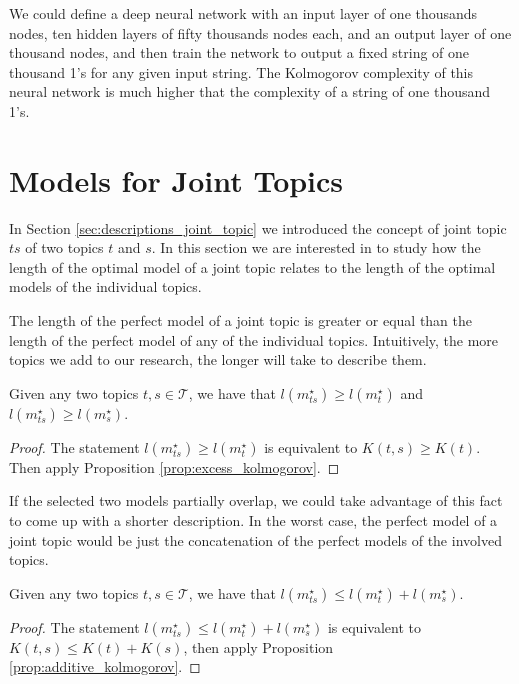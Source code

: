 \begin{example}
\label{ex:description_neural}
We could define a deep neural network with an input layer of one thousands nodes, ten hidden layers of fifty thousands nodes each, and an output layer of one thousand nodes, and then train the network to output a fixed string of one thousand 1's for any given input string. The Kolmogorov complexity of this neural network is much higher that the complexity of a string of one thousand 1's.
\end{example}

%
%

\section{Models for Joint Topics}
\label{sec:descriptions_joint_model}

In Section \ref{sec:descriptions_joint_topic} we introduced the concept of joint topic $ts$ of two topics $t$ and $s$. In this section we are interested in to study how the length of the optimal model of a joint topic relates to the length of the optimal models of the individual topics.

The length of the perfect model of a joint topic is greater or equal than the length of the perfect model of any of the individual topics. Intuitively, the more topics we add to our research, the longer will take to describe them.

\begin{proposition}
\label{prop:joint_length}
Given any two topics $t,s \in \mathcal{T}$, we have that $l \left( m_{ts}^{\star} \right) \geq l \left( m_{t}^{\star} \right)$ and $l \left( m_{ts}^{\star} \right) \geq l \left( m_{s}^{\star} \right)$.
\end{proposition}
\begin{proof}
The statement $l \left( m_{ts}^{\star} \right) \geq l \left( m_{t}^{\star} \right)$ is equivalent to $K(t,s) \geq K(t)$. Then apply Proposition \ref{prop:excess_kolmogorov}.
\end{proof}

If the selected two models partially overlap, we could take advantage of this fact to come up with a shorter description. In the worst case, the perfect model of a joint topic would be just the concatenation of the perfect models of the involved topics.

\begin{proposition}
\label{prop:joint_sum}
Given any two topics $t,s \in \mathcal{T}$, we have that $l \left( m_{ts}^{\star} \right) \leq l \left( m_{t}^{\star} \right) + l \left( m_{s}^{\star} \right)$.
\end{proposition}
\begin{proof}
The statement $l \left( m_{ts}^{\star} \right) \leq l \left( m_{t}^{\star} \right) + l \left( m_{s}^{\star} \right)$ is equivalent to $K(t,s) \leq K(t) + K(s)$, then apply Proposition \ref{prop:additive_kolmogorov}.
\end{proof}

